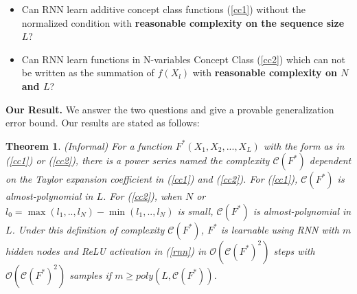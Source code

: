 \documentclass{article}
\newcommand{\cO}{\mathcal{O}}
\newtheorem{theo}{\textbf{Theorem}}
\begin{document}
\begin{itemize}
\item[$\bullet$] Can RNN learn additive concept class functions (\ref{cc1}) without the normalized condition with {\bf reasonable complexity on the sequence size $L$}?
\item[$\bullet$] Can RNN learn functions in N-variables Concept Class (\ref{cc2}) which can not be written as the summation of $f(X_l)$ with {\bf reasonable complexity on  $N$ and $L$}?
\end{itemize}
{\bf Our Result. }
We answer the two questions and give a provable generalization error bound. Our results are stated as follows:
\begin{theo}(Informal) For a function $F^*(X_1,X_2,...,X_L)$ with the form as in (\ref{cc1}) or (\ref{cc2}),  there is a power series named the complexity $\mathscr{C}(F^*)$ dependent on the Taylor expansion coefficient in  (\ref{cc1}) and (\ref{cc2}). For (\ref{cc1}), $\mathscr{C}(F^*)$  is almost-polynomial in $L$. For (\ref{cc2}), when $N$ or $l_0=\max(l_1,..,l_N)-\min(l_1,..,l_N)$ is small, $\mathscr{C}(F^*)$ is almost-polynomial in $L$. Under this definition of complexity $\mathscr{C}(F^*)$, $F^*$ is learnable using RNN with $m$ hidden nodes and ReLU activation in (\ref{rnn}) in $\cO(\mathscr{C}(F^*)^2)$ steps with $\cO(\mathscr{C}(F^*)^2)$ samples if $m\geq poly(L,\mathscr{C}(F^*))$.
\end{theo}
\end{document}
